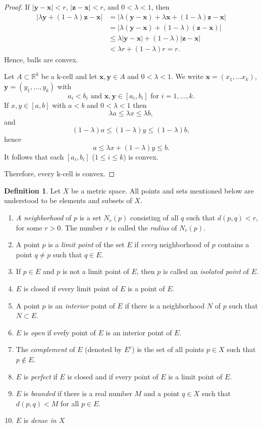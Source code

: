 \documentclass[11pt]{article}
\theoremstyle{definition}
\newtheorem{definition}{Definition}[section]
\theoremstyle{plain}
\theoremstyle{remark}
\newcommand{\R}{\mathbb{R}}
\begin{document}
\begin{proof}
If $|\mathbf{y}-\mathbf{x}|<r$, $|\mathbf{z}-\mathbf{x}|<r$, and $0<\lambda<1$, then
\begin{align*}
    |\lambda\mathbf{y}+(1-\lambda)\mathbf{z}-\mathbf{x}| &= |\lambda(\mathbf{y}-\mathbf{x})+\lambda\mathbf{x}+(1-\lambda)\mathbf{z}-\mathbf{x}| \\
    &= |\lambda(\mathbf{y}-\mathbf{x})+(1-\lambda)(\mathbf{z}-\mathbf{x})| \\
    &\leq \lambda|\mathbf{y}-\mathbf{x}|+(1-\lambda)|\mathbf{z}-\mathbf{x}| \\
    &< \lambda r + (1-\lambda)r = r.
\end{align*}
Hence, balls are convex.

Let $A \subset \R^k$ be a k-cell and let $\mathbf{x},\mathbf{y} \in A$ and $0<\lambda<1$. 
We write $\mathbf{x}=(x_1, \ldots x_k)$, $\mathbf{y}=(y_1, \ldots, y_k)$ with
\[
a_i<b_i \text{ and } \mathbf{x}, \mathbf{y} \in [a_i,b_i] \text{ for } i=1, \ldots, k.
\]
If $x, y \in [a,b]$ with $a<b$ and $0<\lambda<1$ then
\[
{\lambda}a \leq {\lambda}x \leq {\lambda}b,
\]
and
\[
(1-\lambda)a \leq (1-\lambda)y \leq (1-\lambda)b,
\]
hence 
\[
a \leq {\lambda}x+(1-\lambda)y \leq b.
\]
It follows that each $[a_i, b_i]$ ($1 \leq i \leq k$) is convex.

Therefore, every k-cell is convex.
\end{proof}
\begin{definition}
    Let $X$ be a metric space. All points and sets mentioned below are understood to be elements and subsets of $X$.
\begin{enumerate}
\item[(a)] \emph{A neighborhood} of $p$ is a set $N_r(p)$ consisting of all $q$ such that $d(p,q)<r$, for some $r>0$.
The number $r$ is called the \emph{radius} of $N_r(p)$.
\item[(b)] A point $p$ is a \emph{limit point} of the set $E$ if \emph{every} neighborhood of $p$ contains a point $q \neq p$ such that $q \in E$.
\item[(c)] If $p \in E$ and $p$ is not a limit point of $E$, then $p$ is called an \emph{isolated point} of $E$.
\item[(d)] $E$ is closed if every limit point of $E$ is a point of $E$.
\item[(e)] A point $p$ is an \emph{interior} point of $E$ if there is a neighborhood $N$ of $p$ such that $N \subset E$.
\item[(f)] $E$ is \emph{open} if evefy point of $E$ is an interior point of $E$.
\item[(g)] The \emph{complement} of $E$ (denoted by $E^c$) is the set of all points $p \in X$ such that $p \notin E$.
\item[(h)] $E$ is \emph{perfect} if $E$ is closed and if every point of $E$ is a limit point of $E$.
\item[(i)] $E$ is \emph{bounded} if there is a real number $M$ and a point $q \in X$ such that $d(p,q)<M$ for all $p \in E$.    
\item[(j)] $E$ is \emph{dense in $X$}  
\end{enumerate}
\end{definition}
\end{document}
